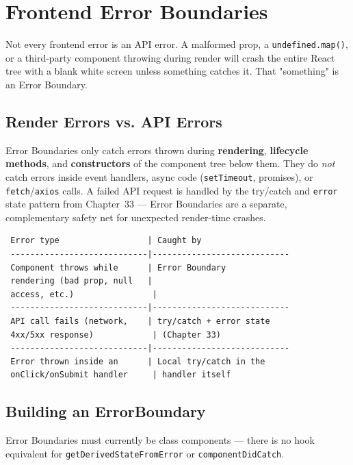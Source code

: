 \chapter{Frontend Error Boundaries}

Not every frontend error is an API error. A malformed prop, a
\texttt{undefined.map()}, or a third-party component throwing during render
will crash the entire React tree with a blank white screen unless something
catches it. That "something" is an Error Boundary.

\section{Render Errors vs. API Errors}

\begin{warnbox}[WARNING]
Error Boundaries only catch errors thrown during \textbf{rendering},
\textbf{lifecycle methods}, and \textbf{constructors} of the component tree
below them. They do \emph{not} catch errors inside event handlers, async
code (\texttt{setTimeout}, promises), or \texttt{fetch}/\texttt{axios}
calls. A failed API request is handled by the try/catch and \texttt{error}
state pattern from Chapter~33 --- Error Boundaries are a separate,
complementary safety net for unexpected render-time crashes.
\end{warnbox}

\begin{diagrambox}
\begin{verbatim}
 Error type                  | Caught by
 ----------------------------|----------------------------
 Component throws while      | Error Boundary
 rendering (bad prop, null   |
 access, etc.)                |
 ----------------------------|----------------------------
 API call fails (network,    | try/catch + error state
 4xx/5xx response)            | (Chapter 33)
 ----------------------------|----------------------------
 Error thrown inside an      | Local try/catch in the
 onClick/onSubmit handler     | handler itself
\end{verbatim}
\end{diagrambox}

\section{Building an ErrorBoundary}

Error Boundaries must currently be class components --- there is no hook
equivalent for \texttt{getDerivedStateFromError} or
\texttt{componentDidCatch}.

